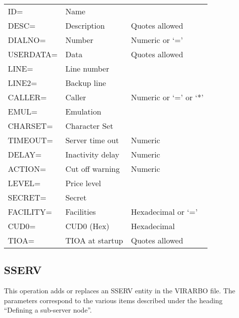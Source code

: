 \documentclass[letterpaper,10pt,english]{sphinxmanual}
\begin{document}
\begin{savenotes}\sphinxattablestart
\centering
\begin{tabulary}{\linewidth}[t]{|T|T|T|}
\hline
{}\relax &\relax &\relax \\
\hline
ID=
&
Name
&\\
\hline
DESC=
&
Description
&
Quotes allowed
\\
\hline
DIALNO=
&
Number
&
Numeric or ‘=’
\\
\hline
USERDATA=
&
Data
&
Quotes allowed
\\
\hline
LINE=
&
Line number
&\\
\hline
LINE2=
&
Backup line
&\\
\hline
CALLER=
&
Caller
&
Numeric or ‘=’ or ‘*’
\\
\hline
EMUL=
&
Emulation
&\\
\hline
CHARSET=
&
Character Set
&\\
\hline
TIMEOUT=
&
Server time out
&
Numeric
\\
\hline
DELAY=
&
Inactivity delay
&
Numeric
\\
\hline
ACTION=
&
Cut off warning
&
Numeric
\\
\hline
LEVEL=
&
Price level
&\\
\hline
SECRET=
&
Secret
&\\
\hline
FACILITY=
&
Facilities
&
Hexadecimal or ‘=’
\\
\hline
CUD0=
&
CUD0 (Hex)
&
Hexadecimal
\\
\hline
TIOA=
&
TIOA at startup
&
Quotes allowed
\\
\hline
\end{tabulary}
\par
\sphinxattableend\end{savenotes}


\subsection{SSERV}
\label{\detokenize{Installation_Guide:sserv}}\label{\detokenize{Installation_Guide:index-171}}
This operation adds or replaces an SSERV entity in the VIRARBO file. The parameters correspond to the various items described under the heading “Defining a sub-server node”.
\end{document}
